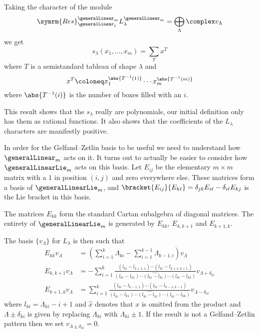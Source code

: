 \documentclass[fleqn]{NotesClass}
\newcommand{\Res}{\symrm{Res}}
\begin{document}
    Taking the character of the module
    \begin{equation}
        \Res^{\generalLinear_m}_{\generalLinear_1} L_\lambda^{\generalLinear_m} = \bigoplus_\Lambda \complex v_\Lambda
    \end{equation}
    we get
    \begin{equation}
        s_\lambda(x_1, \dotsc, x_m) = \sum_{T} x^T
    \end{equation}
    where \(T\) is a semistandard tableau of shape \(\lambda\) and
    \begin{equation}
        x^T \coloneq x_1^{\abs{T^{-1}(1)}} \dotsm x_m^{\abs{T^{-1}(m)}}
    \end{equation}
    where \(\abs{T^{-1}(i)}\) is the number of boxes filled with an \(i\).
    
    This result shows that the \(s_\lambda\) really are polynomials, our initial definition only has them as rational functions.
    It also shows that the coefficients of the \(L_\lambda\) characters are manifestly positive.
    
    In order for the Gelfand--Zetlin basis to be useful we need to understand how \(\generalLinear_m\) acts on it.
    It turns out to actually be easier to consider how \(\generalLinearLie_m\) acts on this basis.
    Let \(E_{ij}\) be the elementary \(m \times m\) matrix with a \(1\) in position \((i,j)\) and zero everywhere else.
    These matrices form a basis of \(\generalLinearLie_m\), and \(\bracket{E_{ij}}{E_{k\ell}} = \delta_{jk}E_{i\ell} - \delta_{i\ell} E_{kj}\) is the Lie bracket in this basis.
    
    The matrices \(E_{kk}\) form the standard Cartan subalgebra of diagonal matrices.
    The entirety of \(\generalLinearLie_m\) is generated by \(E_{kk}\), \(E_{k,k+1}\) and \(E_{k+1,k}\).
    
    The basis \(\{v_\Lambda\}\) for \(L_\lambda\) is then such that
    \begin{align}
        E_{kk} v_\Lambda &= \left( \sum_{i=1}^k \Lambda_{ki} - \sum_{i=1}^{k-1} \Lambda_{k-1,i} \right)v_\Lambda\\
        E_{k,k+1} v_\Lambda &= -\sum_{i=1}^k \frac{(l_{ki} - l_{k+1,1}) \dotsm (l_{ki} - l_{k+1,k+1})}{(l_{ki} - l_{k1}) \dotsm \widehat{(l_{ki} - l_{ki})} \dotsm (l_{ki} - l_{kk})} v_{\Lambda + \delta_{ki}}\\
        E_{k+1,k} v_\Lambda &= \sum_{i=1}^k \frac{(l_{ki} - l_{k-1,1}) \dotsm (l_{ki} - l_{k-1,k-1})}{(l_{ki} - l_{k1}) \dotsm \widehat{(l_{ki} - l_{ki})} \dotsm (l_{ki} - l_{kk})} v_{\Lambda - \delta_{ki}}
    \end{align}
    where \(l_{ki} = \Lambda_{ki} - i + 1\) and \(\widehat{x}\) denotes that \(x\) is omitted from the product and \(\Lambda \pm \delta_{ki}\) is given by replacing \(\Lambda_{ki}\) with \(\Lambda_{ki} \pm 1\).
    If the result is not a Gelfand--Zetlin pattern then we set \(v_{\Lambda \pm \delta_{ki}} = 0\).
    
\end{document}
